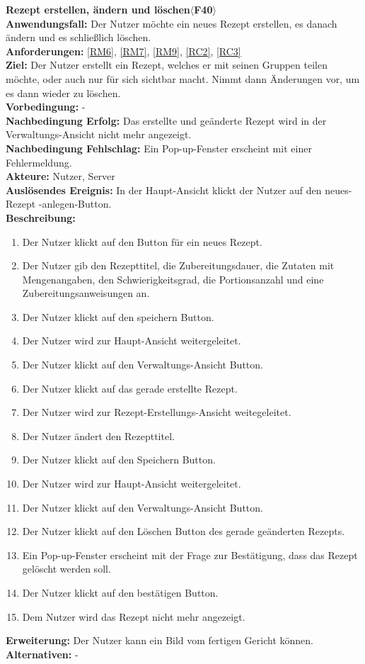 \documentclass[parskip=full]{scrartcl}
\begin{document}
\textbf{Rezept erstellen, ändern und löschen$\langle$F40$\rangle$}\\
\textbf{Anwendungsfall:} Der Nutzer möchte ein neues Rezept erstellen, es danach ändern und es schließlich löschen.\\
\textbf{Anforderungen:} \ref{RM6}, \ref{RM7}, \ref{RM9}, \ref{RC2}, \ref{RC3}\\
\textbf{Ziel:} Der Nutzer erstellt ein Rezept, welches er mit seinen Gruppen teilen möchte, oder auch nur für sich sichtbar macht. Nimmt dann Änderungen vor, um es dann wieder zu löschen.\\
\textbf{Vorbedingung:} -\\
\textbf{Nachbedingung Erfolg:} Das erstellte und geänderte Rezept wird in der Verwaltungs-Ansicht nicht mehr angezeigt.  \\
\textbf{Nachbedingung Fehlschlag:} Ein Pop-up-Fenster erscheint mit einer Fehlermeldung.\\
\textbf{Akteure:} Nutzer, Server\\
\textbf{Auslösendes Ereignis:} In der Haupt-Ansicht klickt der Nutzer auf den neues-Rezept -anlegen-Button.\\
\textbf{Beschreibung:}
\begin{enumerate}
    \item Der Nutzer klickt auf den Button für ein neues Rezept.
    \item Der Nutzer gib den Rezepttitel, die Zubereitungsdauer, die Zutaten mit Mengenangaben, den Schwierigkeitsgrad, die Portionsanzahl und eine Zubereitungsanweisungen an.
    \item Der Nutzer klickt auf den speichern Button.
    \item Der Nutzer wird zur Haupt-Ansicht weitergeleitet.
    \item Der Nutzer klickt auf den Verwaltungs-Ansicht Button.
    \item Der Nutzer klickt auf das gerade erstellte Rezept.
    \item Der Nutzer wird zur Rezept-Erstellungs-Ansicht weitegeleitet.
    \item Der Nutzer ändert den Rezepttitel.
    \item Der Nutzer klickt auf den Speichern Button.
    \item Der Nutzer wird zur Haupt-Ansicht weitergeleitet. 
    \item Der Nutzer klickt auf den Verwaltungs-Ansicht Button.
    \item Der Nutzer klickt auf den Löschen Button des gerade geänderten Rezepts.
    \item Ein Pop-up-Fenster erscheint mit der Frage zur Bestätigung, dass das Rezept gelöscht werden soll.
    \item Der Nutzer klickt auf den bestätigen Button.
    \item Dem Nutzer wird das Rezept nicht mehr angezeigt.
\end{enumerate}
\textbf{Erweiterung:} Der Nutzer kann ein Bild vom fertigen Gericht können.\\
\textbf{Alternativen:} -\\
\newpage
\end{document}
